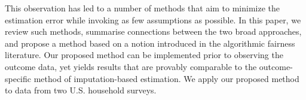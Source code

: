 \documentclass{article} %
\begin{document}



This observation has led to a number of methods that aim to minimize the estimation error while invoking as few assumptions as possible. In this paper, we review such methods, summarise connections between the two broad approaches, and propose a method based on a notion introduced in the algorithmic fairness literature. Our proposed method can be implemented prior to observing the outcome data, yet yields results that are provably comparable to the outcome-specific method of imputation-based estimation. We apply our proposed method to data from two U.S. household surveys. 






\end{document}
